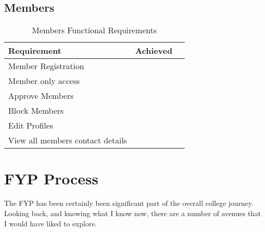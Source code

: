 \subsection{Members}
\begin{table}[H]
\begin{center}
    \begin{tabular}{| l | l | p{1cm} |}
    \hline
    Requirement & Achieved\\ \hline
	Member Registration & \checkmark \\ \hline
	Member only access & \checkmark \\ \hline
	Approve Members & \checkmark \\ \hline
	Block Members & \checkmark \\ \hline
	Edit Profiles & \checkmark \\ \hline
	View all members contact details & \checkmark \\ \hline
	\end{tabular}
\end{center}
\caption{Members Functional Requirements}
\end{table}

\section{FYP Process}

The FYP has been certainly been significant part of the overall college journey. Looking back, and knowing what I know now, there are a number of avenues that I would have liked to explore.
